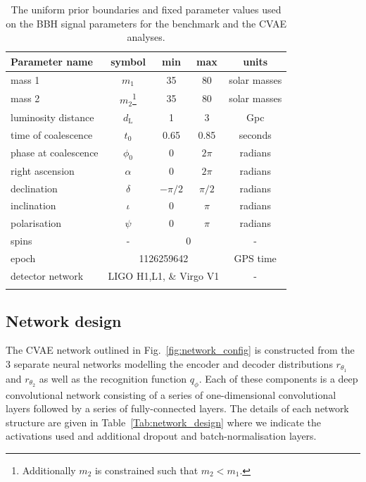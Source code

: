 \documentclass[%
showpacs,
nofootinbib,
 amsmath,amssymb,
 aps,
 twocolumn,
 prl,
 reprint,
floatfix,
]{revtex4-1}
\begin{document}
%
%
\begin{table}
\centering
\caption{The uniform prior boundaries and fixed parameter values used on the \ac{BBH} signal parameters for the benchmark
and the \ac{CVAE} analyses.}
\begin{tabular}[t]{lcccc}
\toprule
Parameter name & symbol & min & max & units \\
\hline
mass 1 & $m_1$ & 35 & 80 & solar masses \\
mass 2 & $m_2$\footnote{Additionally $m_2$ is constrained such that
$m_{2}<m_{1}$.} & 35 & 80 & solar masses \\
luminosity distance & $d_{\text{L}}$ & 1 & 3 & Gpc \\
time of coalescence & $t_{0}$ & 0.65 & 0.85 & seconds \\
phase at coalescence & $\phi_{0}$ & 0 & $2\pi$ & radians \\
right ascension & $\alpha$ & 0 & $2\pi$ & radians \\
declination & $\delta$ & $-\pi/2$ & $\pi/2$ & radians \\
inclination & $\iota$ & 0 & $\pi$ & radians \\
polarisation & $\psi$ & 0 & $\pi$ & radians \\
\hline
spins & - & \multicolumn{2}{c}{0} & - \\
epoch & \multicolumn{3}{c}{1126259642} & GPS time \\
detector network & \multicolumn{3}{c}{LIGO H1,L1, \& Virgo V1} & - \\
\botrule
\end{tabular}
\label{tab:prior_ranges}
\end{table}

\subsection{Network design}\label{sec:network_design}
%
%

%
%
The \ac{CVAE} network outlined in Fig.~\ref{fig:network_config} is constructed from
the 3 separate neural networks modelling the encoder and decoder distributions
$r_{\theta_1}$ and $r_{\theta_2}$ as well as the recognition function
$q_{\phi}$. Each of these components is a deep convolutional network
consisting of a series of one-dimensional convolutional layers followed by a series of
fully-connected layers. The details of each network structure are given in
Table~\ref{Tab:network_design} where we indicate the activations used and additional
dropout and batch-normalisation layers.
\end{document}
